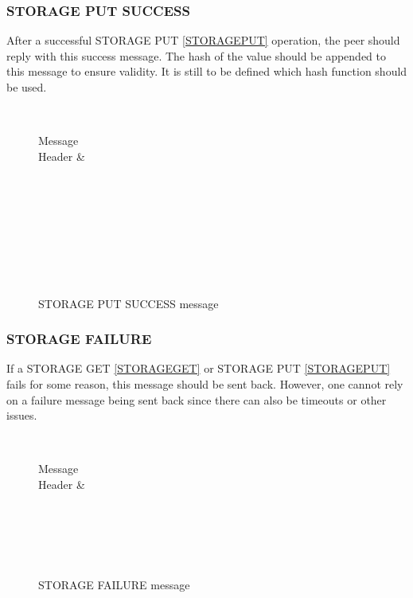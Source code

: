 \documentclass[a4paper, 11pt]{article}
\begin{document}
\subsubsection{STORAGE PUT SUCCESS}

After a successful STORAGE PUT \ref{STORAGEPUT} operation, the peer should reply with this success message. The hash of the value should be appended to this message to ensure validity. It is still to be defined which hash function should be used.

\begin{figure}[H]
	\centering
	\begin{bytefield}[bitwidth=0.8em]{32}
		 \\
		\begin{rightwordgroup}{Message \\  Header}
			 & 
		\end{rightwordgroup} \\
		 \\
		\skippedwords \\
		 \\
		 \\
		\skippedwords \\
		 \\
	\end{bytefield}
	\caption{STORAGE PUT SUCCESS message}
	\label{STORAGEPUTSUCCESS}
\end{figure}

\subsubsection{STORAGE FAILURE}

If a STORAGE GET \ref{STORAGEGET} or STORAGE PUT \ref{STORAGEPUT} fails for some reason, this message should be sent back. However, one cannot rely on a failure message being sent back since there can also be timeouts or other issues.

\begin{figure}[H]
	\centering
	\begin{bytefield}[bitwidth=0.8em]{32}
		 \\
		\begin{rightwordgroup}{Message \\  Header}
			 & 
		\end{rightwordgroup} \\
		 \\
		\skippedwords \\
		 \\
	\end{bytefield}
	\caption{STORAGE FAILURE message}
	\label{STORAGEFAILURE}
\end{figure}
\end{document}

